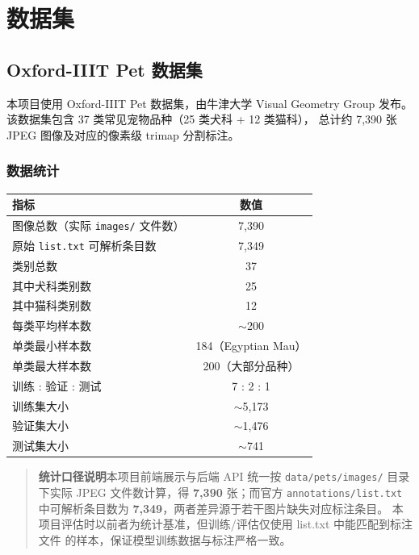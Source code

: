\documentclass[12pt, a4paper, openany]{ctexbook}
\begin{document}
\chapter{数据集}
\label{ch:data}

\section{Oxford-IIIT Pet 数据集}

本项目使用 Oxford-IIIT Pet 数据集\cite{parkhi2012cats}，由牛津大学
Visual Geometry Group 发布。该数据集包含 37 类常见宠物品种（25 类犬科 + 12 类猫科），
总计约 7{,}390 张 JPEG 图像及对应的像素级 trimap 分割标注。

\subsection{数据统计}

\begin{center}
\begin{tabular}{lc}
  \toprule
  \textbf{指标} & \textbf{数值} \\
  \midrule
  图像总数（实际 \texttt{images/} 文件数）& 7{,}390 \\
  原始 \texttt{list.txt} 可解析条目数 & 7{,}349 \\
  类别总数           & 37 \\
  其中犬科类别数     & 25 \\
  其中猫科类别数     & 12 \\
  每类平均样本数     & $\sim$200 \\
  单类最小样本数     & 184（Egyptian Mau）\\
  单类最大样本数     & 200（大部分品种）\\
  训练 : 验证 : 测试 & 7 : 2 : 1 \\
  训练集大小         & $\sim$5{,}173 \\
  验证集大小         & $\sim$1{,}476 \\
  测试集大小         & $\sim$741 \\
  \bottomrule
\end{tabular}
\end{center}

\begin{quote}
\textbf{统计口径说明}\quad 本项目前端展示与后端 API 统一按 \texttt{data/pets/images/}
目录下实际 JPEG 文件数计算，得 \textbf{7{,}390} 张；而官方 \texttt{annotations/list.txt}
中可解析条目数为 \textbf{7{,}349}，两者差异源于若干图片缺失对应标注条目。
本项目评估时以前者为统计基准，但训练/评估仅使用 list.txt 中能匹配到标注文件
的样本，保证模型训练数据与标注严格一致。
\end{quote}
\end{document}
